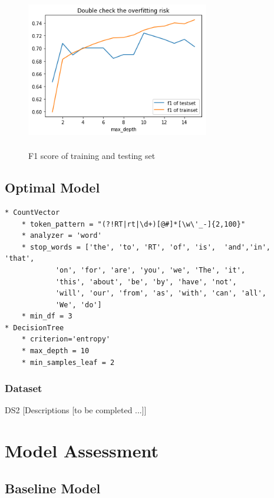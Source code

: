 \documentclass{article} %
\begin{document}
\begin{figure}[H]
	\centering
	\includegraphics[height=7cm, width=8cm]{4.png}
	\caption{F1 score of training and testing set}
\end{figure}

\subsection{Optimal Model}



\lstset{language=Python}
\lstset{frame=lines}
\lstset{basicstyle=\footnotesize}
\begin{lstlisting}
* CountVector
	* token_pattern = "(?!RT|rt|\d+)[@#]*[\w\'_-]{2,100}"
	* analyzer = 'word'
	* stop_words = ['the', 'to', 'RT', 'of', 'is',	'and','in', 'that',
			'on', 'for', 'are',	'you', 'we', 'The', 'it', 
			'this', 'about', 'be', 'by', 'have', 'not', 
			'will', 'our', 'from', 'as', 'with', 'can', 'all', 
			'We', 'do']
	* min_df = 3
* DecisionTree
	* criterion='entropy'
	* max_depth = 10
	* min_samples_leaf = 2
\end{lstlisting}


\subsubsection{Dataset}

DS2 [Descriptions [to be completed ...]]


\section{Model Assessment}

\subsection{Baseline Model}
\end{document}
